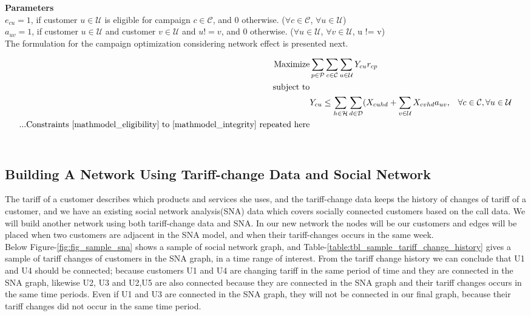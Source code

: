 \documentclass[11pt]{article}
\begin{document}
\noindent \textbf{Parameters}\\

\noindent $e_{{c}{u}}=1$, if customer $u \in \mathcal{U}$ is eligible for campaign $c \in \mathcal{C}$, and 0 otherwise.
($\forall c \in \mathcal{C}$, $\forall u \in \mathcal{U}$)\\

\noindent $a_{{u}{v}}=1$, if customer $u \in \mathcal{U}$ and customer $v \in \mathcal{U}$ and $u != v$, and 0 otherwise.
($\forall u \in \mathcal{U}$, $\forall v \in \mathcal{U}$, u != v)\\


\noindent The formulation for the campaign optimization considering network effect is presented next.

\begin{align}
\text{Maximize} & \displaystyle
\sum\limits_{p\in \mathcal{P}}
\sum\limits_{c\in \mathcal{C}}
\sum\limits_{u\in \mathcal{U}}
Y_{{c}{u}}  r_{{c}{p}} \label{mathmodel_w/n_obj}&
\\
\text{subject to} \notag\\
&Y_{{c}{u}} \leq \sum\limits_{h\in \mathcal{H}}\sum\limits_{d\in \mathcal{D}}(X_{{c}{u}{h}{d}}+\sum\limits_{v\in\mathcal{U}}X_{{c}{v}{h}{d}}a_{{u}{v}},&\forall c \in \mathcal{C}, \forall u \in \mathcal{U} \label{mathmodel_w/n_netcoverage}\\
...\text{Constraints \eqref{mathmodel_eligibility} to \eqref{mathmodel_integrity} repeated here}\notag
\end{align}\\

\subsection{Building A Network Using Tariff-change Data and Social Network}
The tariff of a customer describes which products and services she uses, and the tariff-change data keeps the history of changes of tariff of a customer, and we have an existing social network analysis(SNA) data which covers socially connected customers based on the call data. We will build another network using both tariff-change data and SNA. In our new network the nodes will be our customers and edges will be placed when two customers are adjacent in the SNA model, and when their tariff-changes occurs in the same week.\\

Below Figure-\ref{fig:fig_sample_sna} shows a sample of social network graph, and Table-\ref{table:tbl_sample_tariff_change_history} gives a sample of tariff changes of customers in the SNA graph, in a time range of interest. From the tariff change history we can conclude that U1 and U4 should be connected; because customers U1 and U4 are changing tariff in the same period of time and they are connected in the SNA graph, likewise U2, U3 and U2,U5 are also connected because they are connected in the SNA graph and their tariff changes occurs in the same time periods. Even if U1 and U3 are connected in the SNA graph, they will not be connected in our final graph, because their tariff changes did not occur in the same time period.
\end{document}
